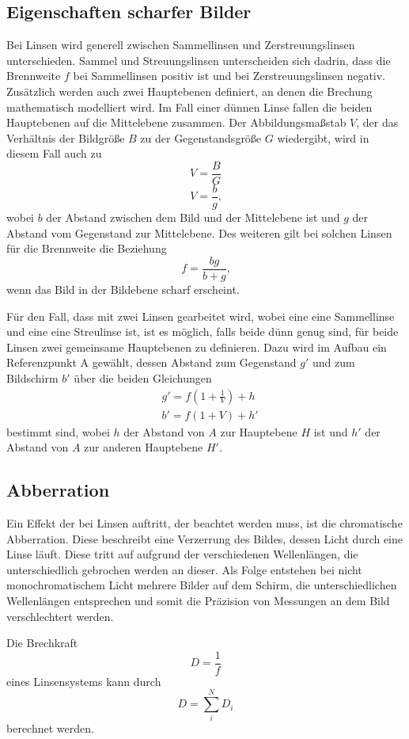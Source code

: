 \subsection{Eigenschaften scharfer Bilder}
    \noindent Bei Linsen wird generell zwischen Sammellinsen und Zerstreuungslinsen unterschieden. Sammel und Streuungslinsen unterscheiden sich dadrin, dass die Brennweite $f$ bei Sammellinsen positiv ist und bei Zerstreuungslinsen negativ.
    Zusätzlich werden auch zwei Hauptebenen definiert, an denen die Brechung mathematisch modelliert wird. Im Fall einer dünnen Linse fallen die beiden Hauptebenen auf die Mittelebene zusammen. Der Abbildungsmaßstab $V$, der das Verhältnis der Bildgröße $B$
    zu der Gegenstandsgröße $G$ wiedergibt, wird in diesem Fall auch zu
    \begin{equation}
        V=\frac{B}{G} 
        \label{eqn:abbildung1}
    \end{equation}
    \begin{equation}
        V=\frac{b}{g} \text{,}
        \label{eqn:abbildung2}
    \end{equation}
    \noindent wobei $b$ der Abstand zwischen dem Bild und der Mittelebene ist und $g$ der Abstand vom Gegenstand zur Mittelebene.
    Des weiteren gilt bei solchen Linsen für die Brennweite die Beziehung
    \begin{equation}
        f=\frac{bg}{b+g} \text{,}
        \label{eqn:brenn1}
    \end{equation}
    \noindent wenn das Bild in der Bildebene scharf erscheint.

    \noindent Für den Fall, dass mit zwei Linsen gearbeitet wird, wobei eine eine Sammellinse und eine eine Streulinse ist, ist es möglich, falls beide dünn genug sind, für beide Linsen zwei gemeinsame Hauptebenen zu definieren.
    Dazu wird im Aufbau ein Referenzpunkt A gewählt, dessen Abstand zum Gegenstand $g'$ und zum Bildschirm $b'$ über die beiden Gleichungen
    \begin{align}
       & g'=f(1+\frac{1}{V})+h \\
        & b'=f(1+V)+h'
        \label{eqn:abbe}
    \end{align}
    bestimmt sind, wobei $h$ der Abstand von $A$ zur Hauptebene $H$ ist und $h'$ der Abstand von $A$ zur anderen Hauptebene $H'$.
\subsection{Abberration}
    \noindent Ein Effekt der bei Linsen auftritt, der beachtet werden muss, ist die chromatische Abberration. Diese beschreibt eine Verzerrung des Bildes, dessen Licht durch eine Linse läuft. Diese tritt auf aufgrund der verschiedenen Wellenlängen, die unterschiedlich gebrochen werden an dieser.
    Als Folge entstehen bei nicht monochromatischem Licht mehrere Bilder auf dem Schirm, die unterschiedlichen Wellenlängen entsprechen und somit die Präzision von Messungen an dem Bild verschlechtert werden.

    \noindent Die Brechkraft
    \begin{equation}
        \label{eqn.Brechkraft}
        D=\frac{1}{f}
    \end{equation}
    eines Linsensystems kann durch
    \begin{equation}
        D=\sum_i^N{D_i}
        \label{Brechkraft2}
    \end{equation}
    berechnet werden.

    \cite{V408}

